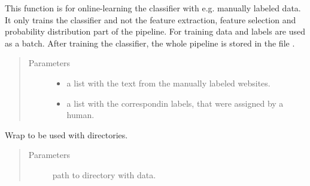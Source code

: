\documentclass[letterpaper,10pt,english]{sphinxmanual}
\begin{document}
\begin{fulllineitems}
\begin{fulllineitems}
This function is for online-learning the classifier with
e.g. manually labeled data. It only trains the classifier and
not the feature extraction, feature selection and probability
distribution part of the pipeline. For training data and
labels are used as a batch. After training the classifier,
the whole pipeline is stored in the file .
\begin{quote}\begin{description}
\item[{Parameters}] \leavevmode\begin{itemize}
\item {} 
 \textendash{} a list with the text from the manually labeled websites.

\item {} 
 \textendash{} a list with the correspondin labels, that were
assigned by a human.

\end{itemize}

\end{description}\end{quote}

\end{fulllineitems}


\begin{fulllineitems}
\label{\detokenize{api:classifier.Classifier.train_batch_dir}}
Wrap {\hyperref[\detokenize{api:classifier.Classifier.train_batch}]{}} to be used with directories.
\begin{quote}\begin{description}
\item[{Parameters}] \leavevmode
{} \textendash{} path to directory with data.

\end{description}\end{quote}

\end{fulllineitems}


\end{fulllineitems}

\label{\detokenize{api:module-probability}}
\end{document}
